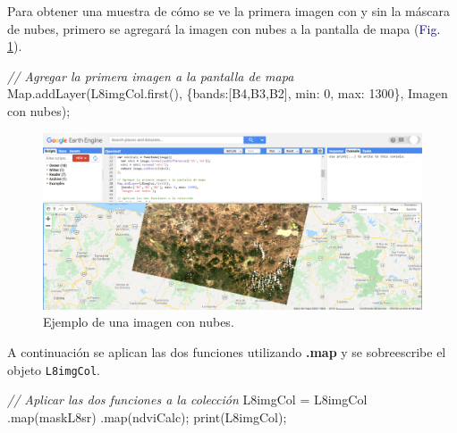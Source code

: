 \documentclass[
  12pt,
  letterpaper,
  twoside]{book}
\newenvironment{Shaded}{\begin{snugshade}}{\end{snugshade}}
\newcommand{\CommentTok}[1]{\textcolor[rgb]{0.24,0.58,0.00}{\textit{#1}}}
\newcommand{\DataTypeTok}[1]{\textcolor[rgb]{0.00,0.00,0.00}{#1}}
\newcommand{\DecValTok}[1]{\textcolor[rgb]{0.28,0.53,0.93}{#1}}
\newcommand{\FunctionTok}[1]{\textcolor[rgb]{0.48,0.12,0.64}{#1}}
\newcommand{\KeywordTok}[1]{\textcolor[rgb]{0.48,0.12,0.64}{#1}}
\newcommand{\NormalTok}[1]{#1}
\newcommand{\OperatorTok}[1]{\textcolor[rgb]{0.00,0.00,0.00}{#1}}
\newcommand{\StringTok}[1]{\textcolor[rgb]{0.87,0.29,0.22}{#1}}
\newcommand\boldpurple[1]{\textcolor{darkpurple}{\textbf{#1}}}
\begin{document}
Para obtener una muestra de cómo se ve la primera imagen con y sin la máscara de nubes, primero se agregará la imagen con nubes a la pantalla de mapa (\textcolor{darkblue}{Fig.} \ref{fig:f1017}).

\begin{Shaded}
\begin{Highlighting}[]
\CommentTok{// Agregar la primera imagen a la pantalla de mapa}
\KeywordTok{Map}\OperatorTok{.}\FunctionTok{addLayer}\NormalTok{(L8imgCol}\OperatorTok{.}\FunctionTok{first}\NormalTok{()}\OperatorTok{,} 
\NormalTok{  \{}\DataTypeTok{bands}\OperatorTok{:}\NormalTok{[}\StringTok{\textquotesingle{}B4\textquotesingle{}}\OperatorTok{,}\StringTok{\textquotesingle{}B3\textquotesingle{}}\OperatorTok{,}\StringTok{\textquotesingle{}B2\textquotesingle{}}\NormalTok{]}\OperatorTok{,} \DataTypeTok{min}\OperatorTok{:} \DecValTok{0}\OperatorTok{,} \DataTypeTok{max}\OperatorTok{:} \DecValTok{1300}\NormalTok{\}}\OperatorTok{,}
  \StringTok{\textquotesingle{}Imagen con nubes\textquotesingle{}}\NormalTok{)}\OperatorTok{;}
\end{Highlighting}
\end{Shaded}

\begin{figure}[H]

{\centering \includegraphics[width=0.95\linewidth]{Img/imNubes} 

}

\caption{Ejemplo de una imagen con nubes.}\label{fig:f1017}
\end{figure}

A continuación se aplican las dos funciones utilizando \boldpurple{.map} y se sobreescribe el objeto \texttt{L8imgCol}.

\begin{Shaded}
\begin{Highlighting}[]
\CommentTok{// Aplicar las dos funciones a la colección}
\NormalTok{L8imgCol }\OperatorTok{=}\NormalTok{ L8imgCol}
  \OperatorTok{.}\FunctionTok{map}\NormalTok{(maskL8sr)}
  \OperatorTok{.}\FunctionTok{map}\NormalTok{(ndviCalc)}\OperatorTok{;}
\FunctionTok{print}\NormalTok{(L8imgCol)}\OperatorTok{;}
\end{Highlighting}
\end{Shaded}
\end{document}
